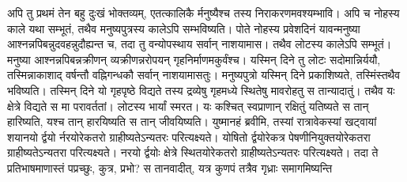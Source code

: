 \vakya अपि तु प्रथमं तेन बहु दुःखं भोक्तव्यम्, एतत्कालिकै र्मनुष्यैश्च तस्य निराकरणमवश्यम्भावि।
\vakya अपि च नोहस्य काले यथा सम्भूतं, तथैव मनुष्यपुत्रस्य कालेऽपि सम्भविष्यति।
\vakya पोते नोहस्य प्रवेशदिनं यावन्मनुष्या आश्नन्नपिबन्नुदवहन्नुदौह्यन्त च, तदा तु वन्योपस्थाय सर्वान् नाशयामास।
\vakya तथैव लोटस्य कालेऽपि सम्भूतं। मनुष्या आश्नन्नपिबन्नक्रीणन् व्यक्रीणन्नरोपयन् गृहनिर्माणमकुर्वंश्च।
\vakya यस्मिन् दिने तु लोटः सदोमान्निर्ययौ, तस्मिन्नाकाशाद् वर्षन्तौ वह्निगन्धकौ सर्वान् नाशयामासतुः।
\vakya मनुष्यपुत्रो यस्मिन् दिने प्रकाशिष्यते, तस्मिंस्तथैव भविष्यति।
\vakya तस्मिन् दिने यो गृहपृष्ठे विद्यते तस्य द्रव्येषु गृहमध्ये स्थितेषु मावरोहतु स तान्यादातुं। तथैव यः क्षेत्रे विद्यते स मा परावर्ततां।
\vakya लोटस्य भार्यां स्मरत।
\vakya यः कश्चित् स्वप्राणान् रक्षितुं यतिष्यते स तान् हारिष्यति, यश्च तान् हारयिष्यति स तान् जीवयिष्यति।
\vakya युष्मानहं ब्रवीमि, तस्यां रात्रावेकस्यां खट्वायां शयानयो र्द्वयो र्नरयोरेकतरो ग्राहीष्यतेऽन्यतरः परित्यक्ष्यते।
\vakya योषितो र्द्वयोरेकत्र पेषणीनियुक्तयोरेकतरा ग्राहीष्यतेऽन्यतरा परित्यक्ष्यते।
\vakya नरयो र्द्वयोः क्षेत्रे स्थितयोरेकतरो ग्राहीष्यतेऽन्यतरः परित्यक्ष्यते।
\vakya तदा ते प्रतिभाषमाणास्तं पप्रच्छुः, कुत्र, प्रभो? स तानवादीत्, यत्र कुणपं तत्रैव गृध्राः समागमिष्यन्ति\eoc